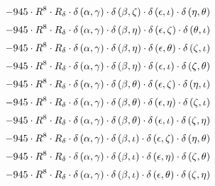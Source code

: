 \begin{subequations}
\begin{gather}
 \\[0.2em] \notag 		 - 945 \cdot R^{8} \cdot R_{\delta{}} \cdot \delta{}\left(\alpha{}, \gamma{}\right) \cdot \delta{}\left(\beta{}, \zeta{}\right) \cdot \delta{}\left(\epsilon{}, \iota{}\right) \cdot \delta{}\left(\eta{}, \theta{}\right) 
 \\[0.2em] \notag 		 - 945 \cdot R^{8} \cdot R_{\delta{}} \cdot \delta{}\left(\alpha{}, \gamma{}\right) \cdot \delta{}\left(\beta{}, \eta{}\right) \cdot \delta{}\left(\epsilon{}, \zeta{}\right) \cdot \delta{}\left(\theta{}, \iota{}\right) 
 \\[0.2em] \notag 		 - 945 \cdot R^{8} \cdot R_{\delta{}} \cdot \delta{}\left(\alpha{}, \gamma{}\right) \cdot \delta{}\left(\beta{}, \eta{}\right) \cdot \delta{}\left(\epsilon{}, \theta{}\right) \cdot \delta{}\left(\zeta{}, \iota{}\right) 
 \\[0.2em] \notag 		 - 945 \cdot R^{8} \cdot R_{\delta{}} \cdot \delta{}\left(\alpha{}, \gamma{}\right) \cdot \delta{}\left(\beta{}, \eta{}\right) \cdot \delta{}\left(\epsilon{}, \iota{}\right) \cdot \delta{}\left(\zeta{}, \theta{}\right) 
 \\[0.2em] \notag 		 - 945 \cdot R^{8} \cdot R_{\delta{}} \cdot \delta{}\left(\alpha{}, \gamma{}\right) \cdot \delta{}\left(\beta{}, \theta{}\right) \cdot \delta{}\left(\epsilon{}, \zeta{}\right) \cdot \delta{}\left(\eta{}, \iota{}\right) 
 \\[0.2em] \notag 		 - 945 \cdot R^{8} \cdot R_{\delta{}} \cdot \delta{}\left(\alpha{}, \gamma{}\right) \cdot \delta{}\left(\beta{}, \theta{}\right) \cdot \delta{}\left(\epsilon{}, \eta{}\right) \cdot \delta{}\left(\zeta{}, \iota{}\right) 
 \\[0.2em] \notag 		 - 945 \cdot R^{8} \cdot R_{\delta{}} \cdot \delta{}\left(\alpha{}, \gamma{}\right) \cdot \delta{}\left(\beta{}, \theta{}\right) \cdot \delta{}\left(\epsilon{}, \iota{}\right) \cdot \delta{}\left(\zeta{}, \eta{}\right) 
 \\[0.2em] \notag 		 - 945 \cdot R^{8} \cdot R_{\delta{}} \cdot \delta{}\left(\alpha{}, \gamma{}\right) \cdot \delta{}\left(\beta{}, \iota{}\right) \cdot \delta{}\left(\epsilon{}, \zeta{}\right) \cdot \delta{}\left(\eta{}, \theta{}\right) 
 \\[0.2em] \notag 		 - 945 \cdot R^{8} \cdot R_{\delta{}} \cdot \delta{}\left(\alpha{}, \gamma{}\right) \cdot \delta{}\left(\beta{}, \iota{}\right) \cdot \delta{}\left(\epsilon{}, \eta{}\right) \cdot \delta{}\left(\zeta{}, \theta{}\right) 
 \\[0.2em] \notag 		 - 945 \cdot R^{8} \cdot R_{\delta{}} \cdot \delta{}\left(\alpha{}, \gamma{}\right) \cdot \delta{}\left(\beta{}, \iota{}\right) \cdot \delta{}\left(\epsilon{}, \theta{}\right) \cdot \delta{}\left(\zeta{}, \eta{}\right) 

\end{gather}
\end{subequations}
